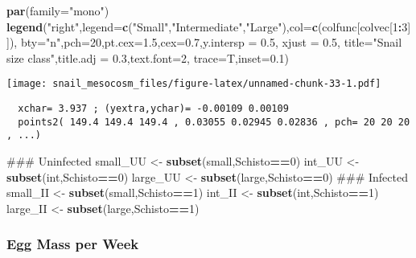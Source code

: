 \documentclass[10,portrait]{article}
\newenvironment{Shaded}{\begin{snugshade}}{\end{snugshade}}
\newcommand{\KeywordTok}[1]{\textcolor[rgb]{0.13,0.29,0.53}{\textbf{#1}}}
\newcommand{\DataTypeTok}[1]{\textcolor[rgb]{0.13,0.29,0.53}{#1}}
\newcommand{\DecValTok}[1]{\textcolor[rgb]{0.00,0.00,0.81}{#1}}
\newcommand{\FloatTok}[1]{\textcolor[rgb]{0.00,0.00,0.81}{#1}}
\newcommand{\StringTok}[1]{\textcolor[rgb]{0.31,0.60,0.02}{#1}}
\newcommand{\OperatorTok}[1]{\textcolor[rgb]{0.81,0.36,0.00}{\textbf{#1}}}
\newcommand{\NormalTok}[1]{#1}
\begin{document}
\begin{Shaded}
\begin{Highlighting}[]
\KeywordTok{par}\NormalTok{(}\DataTypeTok{family=}\StringTok{"mono"}\NormalTok{)}
\KeywordTok{legend}\NormalTok{(}\StringTok{"right"}\NormalTok{,}\DataTypeTok{legend=}\KeywordTok{c}\NormalTok{(}\StringTok{"Small"}\NormalTok{,}\StringTok{"Intermediate"}\NormalTok{,}\StringTok{"Large"}\NormalTok{),}\DataTypeTok{col=}\KeywordTok{c}\NormalTok{(colfunc[colvec[}\DecValTok{1}\OperatorTok{:}\DecValTok{3}\NormalTok{]]),}
       \DataTypeTok{bty=}\StringTok{"n"}\NormalTok{,}\DataTypeTok{pch=}\DecValTok{20}\NormalTok{,}\DataTypeTok{pt.cex=}\FloatTok{1.5}\NormalTok{,}\DataTypeTok{cex=}\FloatTok{0.7}\NormalTok{,}\DataTypeTok{y.intersp =} \FloatTok{0.5}\NormalTok{, }\DataTypeTok{xjust =} \FloatTok{0.5}\NormalTok{,}
       \DataTypeTok{title=}\StringTok{"Snail size class"}\NormalTok{,}\DataTypeTok{title.adj =} \FloatTok{0.3}\NormalTok{,}\DataTypeTok{text.font=}\DecValTok{2}\NormalTok{,}
       \DataTypeTok{trace=}\NormalTok{T,}\DataTypeTok{inset=}\FloatTok{0.1}\NormalTok{)}
\end{Highlighting}
\end{Shaded}

\texttt{[image: snail\_mesocosm\_files/figure-latex/unnamed-chunk-33-1.pdf]}

\begin{verbatim}
  xchar= 3.937 ; (yextra,ychar)= -0.00109 0.00109 
  points2( 149.4 149.4 149.4 , 0.03055 0.02945 0.02836 , pch= 20 20 20 , ...) 
\end{verbatim}

\begin{Shaded}
\begin{Highlighting}[]
\NormalTok{### Uninfected}
\NormalTok{small_UU <-}\StringTok{ }\KeywordTok{subset}\NormalTok{(small,Schisto}\OperatorTok{==}\DecValTok{0}\NormalTok{)}
\NormalTok{int_UU <-}\StringTok{ }\KeywordTok{subset}\NormalTok{(int,Schisto}\OperatorTok{==}\DecValTok{0}\NormalTok{)}
\NormalTok{large_UU <-}\StringTok{ }\KeywordTok{subset}\NormalTok{(large,Schisto}\OperatorTok{==}\DecValTok{0}\NormalTok{)}
\NormalTok{### Infected}
\NormalTok{small_II <-}\StringTok{ }\KeywordTok{subset}\NormalTok{(small,Schisto}\OperatorTok{==}\DecValTok{1}\NormalTok{)}
\NormalTok{int_II <-}\StringTok{ }\KeywordTok{subset}\NormalTok{(int,Schisto}\OperatorTok{==}\DecValTok{1}\NormalTok{)}
\NormalTok{large_II <-}\StringTok{ }\KeywordTok{subset}\NormalTok{(large,Schisto}\OperatorTok{==}\DecValTok{1}\NormalTok{)}
\end{Highlighting}
\end{Shaded}

\subsubsection{Egg Mass per Week}\label{egg-mass-per-week}
\end{document}
